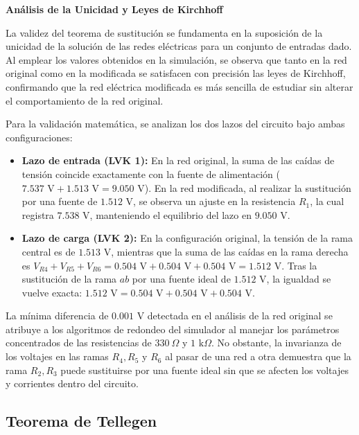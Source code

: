 \textbf{Análisis de la Unicidad y Leyes de Kirchhoff}

La validez del teorema de sustitución se fundamenta en la suposición de la unicidad de la solución de las redes eléctricas para un conjunto de entradas dado. Al emplear los valores obtenidos en la simulación, se observa que tanto en la red original como en la modificada se satisfacen con precisión las leyes de Kirchhoff, confirmando que la red eléctrica modificada es más sencilla de estudiar sin alterar el comportamiento de la red original.

Para la validación matemática, se analizan los dos lazos del circuito bajo ambas configuraciones:

\begin{itemize}
	\item \textbf{Lazo de entrada (LVK 1):} En la red original, la suma de las caídas de tensión coincide exactamente con la fuente de alimentación ($7.537\text{ V} + 1.513\text{ V} = 9.050\text{ V}$). En la red modificada, al realizar la sustitución por una fuente de $1.512\text{ V}$, se observa un ajuste en la resistencia $R_1$, la cual registra $7.538\text{ V}$, manteniendo el equilibrio del lazo en $9.050\text{ V}$.
	
	\item \textbf{Lazo de carga (LVK 2):} En la configuración original, la tensión de la rama central es de $1.513\text{ V}$, mientras que la suma de las caídas en la rama derecha es $V_{R4} + V_{R5} + V_{R6} = 0.504\text{ V} + 0.504\text{ V} + 0.504\text{ V} = 1.512\text{ V}$. Tras la sustitución de la rama $ab$ por una fuente ideal de $1.512\text{ V}$, la igualdad se vuelve exacta: $1.512\text{ V} = 0.504\text{ V} + 0.504\text{ V} + 0.504\text{ V}$.
\end{itemize}

La mínima diferencia de $0.001\text{ V}$ detectada en el análisis de la red original se atribuye a los algoritmos de redondeo del simulador al manejar los parámetros concentrados de las resistencias de $330~\Omega$ y $1\text{ k}\Omega$. No obstante, la invarianza de los voltajes en las ramas $R_4, R_5$ y $R_6$ al pasar de una red a otra demuestra que la rama $R_2, R_3$ puede sustituirse por una fuente ideal sin que se afecten los voltajes y corrientes dentro del circuito.

\subsection{Teorema de Tellegen}

